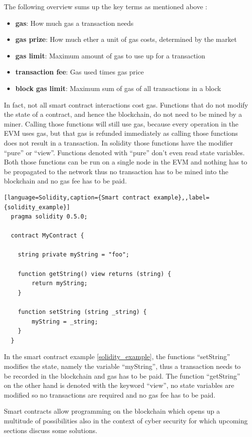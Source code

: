 The following overview sums up the key terms as mentioned above \cite{blockgeeks}:
\begin{itemize}
  \item {\textbf{gas}: How much gas a transaction needs }
  \item {\textbf{gas prize}: How much ether a unit of gas costs, determined by the market}
  \item {\textbf{gas limit}: Maximum amount of gas to use up for a transaction}
  \item {\textbf{transaction fee}: Gas used times gas price}
  \item {\textbf{block gas limit}: Maximum sum of gas of all transactions in a block}

\end{itemize}

In fact, not all smart contract interactions cost gas. Functions that do not modify the state of a contract, and hence the blockchain, do not need to be mined by a miner.
Calling those functions will still use gas, because every operation in the EVM uses gas, but that gas is refunded immediately as calling those functions does not result in a transaction.
In solidity those functions have the modifier ``pure'' or ``view''. Functions denoted with ``pure'' don't even read state variables. Both those functions can be run on a single node in the EVM and
nothing has to be propagated to the network thus no transaction has to be mined into the blockchain and no gas fee has to be paid\cite{blockgeeks}.

\begin{lstlisting}[language=Solidity,caption={Smart contract example},,label={solidity_example}]
  pragma solidity 0.5.0;

  contract MyContract {

    string private myString = "foo";

    function getString() view returns (string) {
        return myString;
    }

    function setString (string _string) {
        myString = _string;
    }
  }
  \end{lstlisting}

In the smart contract example \ref{solidity_example}, the functions ``setString'' modifies the state, namely the variable ``myString'', thus a transaction needs to be recorded in the blockchain and gas has to be paid.
The function ``getString'' on the other hand is denoted with the keyword ``view'', no state variables are modified so no transactions are required and no gas fee has to be paid.

Smart contracts allow programming on the blockchain which opens up a multitude of possibilities also in the context of cyber security for which upcoming sections discuss some solutions.
